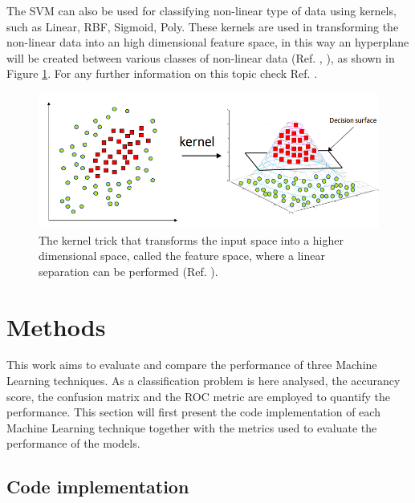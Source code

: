 \documentclass[english,notitlepage,reprint,nofootinbib]{revtex4-1}  %
\begin{document}
 
 
The SVM can also be used for classifying non-linear type of data using kernels, such as Linear, RBF, Sigmoid, Poly. These kernels are used in transforming the non-linear data into an high dimensional feature space, in this way an hyperplane will be created between various classes of non-linear data (Ref. \cite{svm3}, \cite{svm4}), as shown in Figure \ref{fig:kernel}. For any further information on this topic check Ref. \cite{svm1}.

 \begin{figure}[h]
    \centering 
    \includegraphics[scale=0.25]{img/kernel.png}
    \caption{The kernel trick that transforms the input space into a higher dimensional space, called the feature space, where a linear separation can be performed (Ref. \cite{svm1}).}
    \label{fig:kernel}
\end{figure}



\section{Methods} \label{sec:methods}

This work aims to evaluate and compare the performance of three Machine Learning techniques. As a classification problem is here analysed, the accurancy score, the confusion matrix and the ROC metric are employed to quantify the performance. This section will first present the code implementation of each Machine Learning technique together with the metrics used to evaluate the performance of the models. 


\subsection{Code implementation}\label{sec:code}
\end{document}

